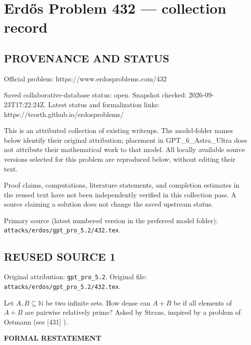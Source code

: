 \section*{Erd\H{o}s Problem 432 --- collection record}

\subsection*{PROVENANCE AND STATUS}
Official problem: https://www.erdosproblems.com/432

Saved collaborative-database status: open.
Snapshot checked: 2026-09-23T17:22:24Z.
Latest status and formalization links: https://teorth.github.io/erdosproblems/

This is an attributed collection of existing writeups. The model-folder names below identify their original attribution; placement in GPT\_6\_Astra\_Ultra does not attribute their mathematical work to that model. All locally available source versions selected for this problem are reproduced below, without editing their text.

Proof claims, computations, literature statements, and completion estimates in the reused text have not been independently verified in this collection pass. A source claiming a solution does not change the saved upstream status.

Primary source (latest numbered version in the preferred model folder): \texttt{attacks/erdos/gpt\_pro\_5.2/432.tex}.

\subsection*{REUSED SOURCE 1}
Original attribution: \texttt{gpt\_pro\_5.2}.
Original file: \texttt{attacks/erdos/gpt\_pro\_5.2/432.tex}.


Let $A,B\subseteq \mathbb{N}$ be two infinite sets. How dense can $A+B$ be if all elements of $A+B$ are pairwise relatively prime? Asked by Straus, inspired by a problem of Ostmann (see [431] ).


\medskip
\noindent\textbf{FORMAL RESTATEMENT}

